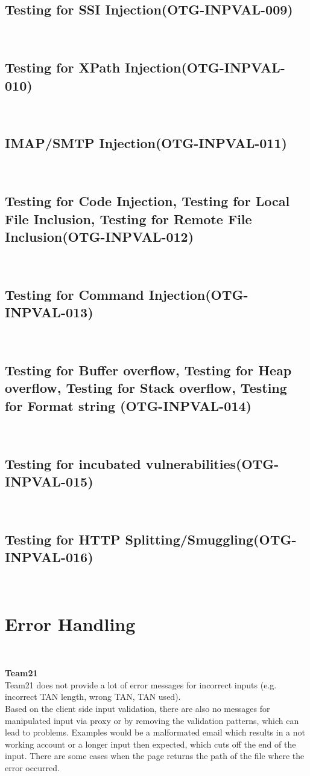 \documentclass[headsepline,footsepline,footinclude=false,oneside,fontsize=11pt,paper=a4,listof=totoc,bibliography=totoc]{scrbook} %
\begin{document}
\subsection{Testing for SSI Injection(OTG-INPVAL-009)}\
\pagebreak 
\subsection{Testing for XPath Injection(OTG-INPVAL-010)}\
\pagebreak 
\subsection{IMAP/SMTP Injection(OTG-INPVAL-011)}\
\pagebreak 
\subsection{Testing for Code Injection, Testing for Local File Inclusion, Testing for Remote File Inclusion(OTG-INPVAL-012)}\
\pagebreak 
\subsection{Testing for Command Injection(OTG-INPVAL-013)}\
\pagebreak 
\subsection{Testing for Buffer overflow, Testing for Heap overflow, Testing for Stack overflow, Testing for Format string (OTG-INPVAL-014)}\
\pagebreak 
\subsection{Testing for incubated vulnerabilities(OTG-INPVAL-015)}\
\pagebreak 
\subsection{Testing for HTTP Splitting/Smuggling(OTG-INPVAL-016)}\

\section{Error Handling}\

\textbf{Team21}\\

Team21 does not provide a lot of error messages for incorrect inputs (e.g. incorrect TAN
length, wrong TAN, TAN used). \\ 
Based on the client side input validation, there are also no messages for manipulated input via proxy or by removing the validation patterns, which can lead to problems. Examples would be a malformated email which results in a not working account or a longer input then expected, which cuts off the end of the input. There are some cases when the page returns the path of the file where the error occurred.\\   
 
\end{document}
